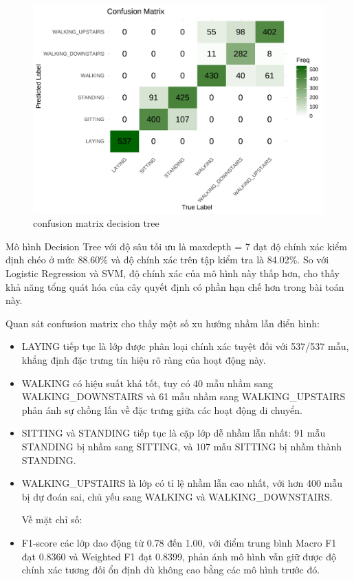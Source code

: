 \documentclass[
]{article}
\begin{document}
\begin{figure}
\centering
\includegraphics{report_files/figure-latex/unnamed-chunk-25-1.pdf}
\caption{confusion matrix decision tree}
\end{figure}

Mô hình Decision Tree với độ sâu tối ưu là maxdepth = 7 đạt độ chính xác
kiểm định chéo ở mức 88.60\% và độ chính xác trên tập kiểm tra là
84.02\%. So với Logistic Regression và SVM, độ chính xác của mô hình này
thấp hơn, cho thấy khả năng tổng quát hóa của cây quyết định có phần hạn
chế hơn trong bài toán này.

Quan sát confusion matrix cho thấy một số xu hướng nhầm lẫn điển hình:

\begin{itemize}
\item
  LAYING tiếp tục là lớp được phân loại chính xác tuyệt đối với 537/537
  mẫu, khẳng định đặc trưng tín hiệu rõ ràng của hoạt động này.
\item
  WALKING có hiệu suất khá tốt, tuy có 40 mẫu nhầm sang
  WALKING\_DOWNSTAIRS và 61 mẫu nhầm sang WALKING\_UPSTAIRS phản ánh sự
  chồng lấn về đặc trưng giữa các hoạt động di chuyển.
\item
  SITTING và STANDING tiếp tục là cặp lớp dễ nhầm lẫn nhất: 91 mẫu
  STANDING bị nhầm sang SITTING, và 107 mẫu SITTING bị nhầm thành
  STANDING.
\item
  WALKING\_UPSTAIRS là lớp có tỉ lệ nhầm lẫn cao nhất, với hơn 400 mẫu
  bị dự đoán sai, chủ yếu sang WALKING và WALKING\_DOWNSTAIRS.

  Về mặt chỉ số:
\item
  F1-score các lớp dao động từ 0.78 đến 1.00, với điểm trung bình Macro
  F1 đạt 0.8360 và Weighted F1 đạt 0.8399, phản ánh mô hình vẫn giữ được
  độ chính xác tương đối ổn định dù không cao bằng các mô hình trước đó.
\end{itemize}
\end{document}
